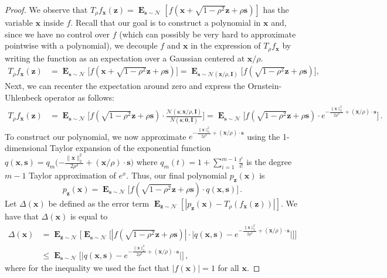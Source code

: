 \documentclass{theoretics}
\newcommand\twonorm[1]{\|#1\|_2}
\renewcommand\vec[1]{\mathbf{#1}}
\DeclareMathOperator*{\E}{\mathbf{E}}
\newcommand{\normal}{\mathcal{N}}
\newcommand{\1}{\Ind}
\newcommand{\x}{\vec x}
\newcommand{\z}{\vec z}
\newcommand{\Gauss}{\mathcal{N}}
\begin{document}
\begin{proof}
   We observe that  $T_{\rho}f_{\x}(\z)=\E_{\vec s\sim \Gauss}[f(\x+\sqrt{1-\rho^2}\z+\rho \vec s)]$ has 
   the variable $\x$ inside $f$. Recall that our goal is to construct a polynomial in $\x$ and, since we have no control over $f$ (which can possibly be very hard to approximate pointwise with a polynomial), we decouple $f$ and $\x$ in the expression of $T_{\rho}f_{\x}$ by writing the function as an expectation over a Gaussian centered at $\x/\rho$. 
    \begin{align*}
        T_{\rho}f_{\x}(\z)&=\E_{\vec s\sim \Gauss}\bigl[f(\x+\sqrt{1-\rho^2}\z+\rho\vec s)\bigr]
        =\E_{\vec s\sim \Gauss(\vec x/\rho,\vec I)}\bigl[f(\sqrt{1-\rho^2}\z+\rho\vec s)\bigr],
        \end{align*}
        Next, we can recenter the expectation around zero and express the Ornstein-Uhlenbeck operator as follows:
    \begin{align*}
        T_{\rho}f_{\x}(\z) &=\E_{\vec s\sim \Gauss}\biggl[f(\sqrt{1-\rho^2}\z+\rho\vec s)\cdot \frac{\Gauss(\vec s;\x/\rho,\vec I)}{N(\vec s;\vec 0,\vec I)}\biggr] =
        \E_{\vec s\sim \Gauss}\biggl[
        f(\sqrt{1-\rho^2}\z+\rho\vec s)\cdot e^{-\frac{\twonorm{\x}^2}{2\rho^2}+(\x/\rho)\cdot \vec s}
        \biggr] \,.
    \end{align*}
    To construct our polynomial, we now approximate ${e^{-\frac{\twonorm{\x}^2}{2\rho^2}+ (\x/\rho)\cdot\vec s}}$ using the 1-dimensional Taylor expansion of the exponential function $q(\x,\vec s)=q_m\bigl({-\frac{\twonorm{\x}^2}{2\rho^2}+(\x/\rho)\cdot\vec s}\bigr)$ where $q_{m}(t)=1+\sum_{i=1}^{m-1}\frac{t^i}{i!}$ is the degree $m-1$ Taylor approximation of $e^x$. Thus, our final polynomial $p_{\z}(\x)$ is 
    \[
        p_{\z}(\x)=\E_{\vec s\sim \Gauss}\bigl[f(\sqrt{1-\rho^2}\z+\rho\vec s)\cdot q(\x,\vec s)\bigr]\,.
    \]
    Let $\Delta(\x)$ be defined as the error term $\E_{\z \sim \normal}[|p_{\z}(\x)-T_{\rho}(f_{\x}(\z))|]$. 
    We have that $\Delta(\x)$ is equal to 
    \begin{align*}
    \Delta(\x) &=
    \E_{\z\sim \Gauss}\Big[\E_{\vec s\sim \Gauss}\bigl[|f(\sqrt{1-\rho^2}\z+\rho\vec s)|\cdot 
    \big|q(\x,\vec s)-e^{-\frac{\twonorm{\x}^2}{2\rho^2}+(\x/\rho)\cdot\vec s}\big| \Big]  \Big]
    \\
    &\leq 
    \E_{\vec s\sim \Gauss}\Big[\big|q(\x,\vec s)-e^{-\frac{\twonorm{\x}^2}{2\rho^2}+(\x/\rho)\cdot\vec s}\big| \Big]
    \,,
    \end{align*}
    where for the inequality we used the fact that $|f(\vec x)|=1$ for all $\x$.

\end{proof}
\end{document}
